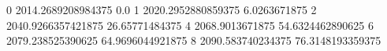0 2014.2689208984375 0.0
1 2020.2952880859375 6.0263671875
2 2040.9266357421875 26.65771484375
4 2068.9013671875 54.6324462890625
6 2079.238525390625 64.9696044921875
8 2090.583740234375 76.3148193359375
